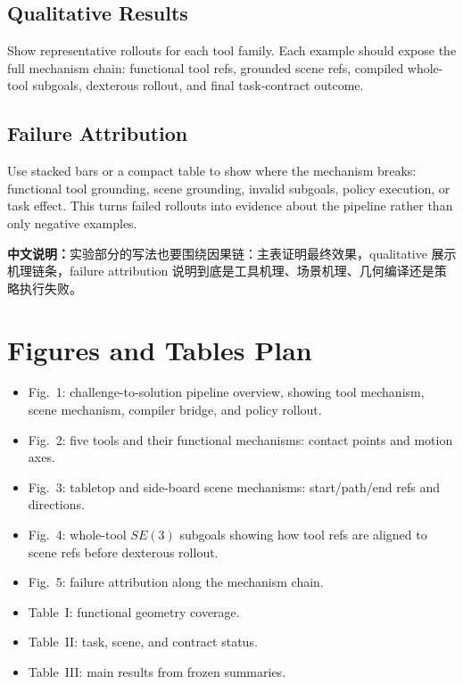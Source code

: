 \documentclass[journal]{IEEEtran}
\newcommand{\cn}[1]{\par\smallskip\noindent\textbf{中文说明：}#1\par\smallskip}
\begin{document}
\subsection{Qualitative Results}
Show representative rollouts for each tool family. Each example should expose
the full mechanism chain: functional tool refs, grounded scene refs, compiled
whole-tool subgoals, dexterous rollout, and final task-contract outcome.

\subsection{Failure Attribution}
Use stacked bars or a compact table to show where the mechanism breaks:
functional tool grounding, scene grounding, invalid subgoals, policy execution,
or task effect. This turns failed rollouts into evidence about the pipeline
rather than only negative examples.

\cn{实验部分的写法也要围绕因果链：主表证明最终效果，qualitative 展示机理链条，failure attribution 说明到底是工具机理、场景机理、几何编译还是策略执行失败。}

\section{Figures and Tables Plan}
\begin{itemize}
  \item Fig.~1: challenge-to-solution pipeline overview, showing tool
  mechanism, scene mechanism, compiler bridge, and policy rollout.
  \item Fig.~2: five tools and their functional mechanisms: contact points and
  motion axes.
  \item Fig.~3: tabletop and side-board scene mechanisms: start/path/end refs
  and directions.
  \item Fig.~4: whole-tool $SE(3)$ subgoals showing how tool refs are aligned
  to scene refs before dexterous rollout.
  \item Fig.~5: failure attribution along the mechanism chain.
  \item Table~I: functional geometry coverage.
  \item Table~II: task, scene, and contract status.
  \item Table~III: main results from frozen summaries.
\end{itemize}
\end{document}
